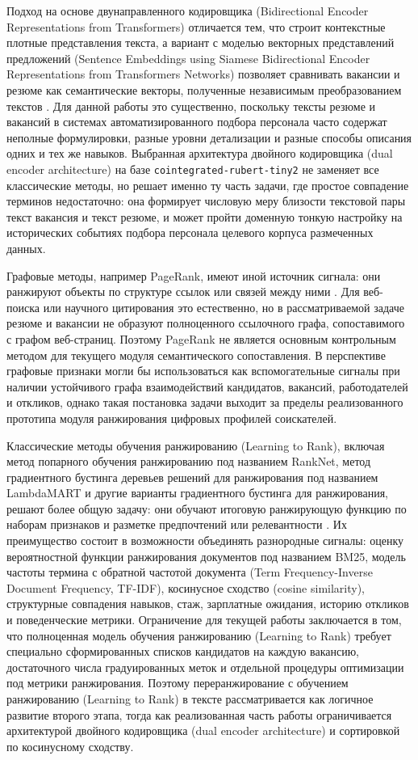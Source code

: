 Подход на основе двунаправленного кодировщика (Bidirectional Encoder Representations from Transformers) отличается тем, что строит контекстные плотные представления текста, а вариант с моделью векторных представлений предложений (Sentence Embeddings using Siamese Bidirectional Encoder Representations from Transformers Networks) позволяет сравнивать вакансии и резюме как семантические векторы, полученные независимым преобразованием текстов \cite{src05, src06}. Для данной работы это существенно, поскольку тексты резюме и вакансий в системах автоматизированного подбора персонала часто содержат неполные формулировки, разные уровни детализации и разные способы описания одних и тех же навыков. Выбранная архитектура двойного кодировщика (dual encoder architecture) на базе \texttt{cointegrated-rubert-tiny2} не заменяет все классические методы, но решает именно ту часть задачи, где простое совпадение терминов недостаточно: она формирует числовую меру близости текстовой пары текст вакансия и текст резюме, и может пройти доменную тонкую настройку на исторических событиях подбора персонала целевого корпуса размеченных данных.

Графовые методы, например PageRank, имеют иной источник сигнала: они ранжируют объекты по структуре ссылок или связей между ними \cite{src27}. Для веб-поиска или научного цитирования это естественно, но в рассматриваемой задаче резюме и вакансии не образуют полноценного ссылочного графа, сопоставимого с графом веб-страниц. Поэтому PageRank не является основным контрольным методом для текущего модуля семантического сопоставления. В перспективе графовые признаки могли бы использоваться как вспомогательные сигналы при наличии устойчивого графа взаимодействий кандидатов, вакансий, работодателей и откликов, однако такая постановка задачи выходит за пределы реализованного прототипа модуля ранжирования цифровых профилей соискателей.

Классические методы обучения ранжированию (Learning to Rank), включая метод попарного обучения ранжированию под названием RankNet, метод градиентного бустинга деревьев решений для ранжирования под названием LambdaMART и другие варианты градиентного бустинга для ранжирования, решают более общую задачу: они обучают итоговую ранжирующую функцию по наборам признаков и разметке предпочтений или релевантности \cite{src08, src09, src28}. Их преимущество состоит в возможности объединять разнородные сигналы: оценку вероятностной функции ранжирования документов под названием BM25, модель частоты термина с обратной частотой документа (Term Frequency-Inverse Document Frequency, TF-IDF), косинусное сходство (cosine similarity), структурные совпадения навыков, стаж, зарплатные ожидания, историю откликов и поведенческие метрики. Ограничение для текущей работы заключается в том, что полноценная модель обучения ранжированию (Learning to Rank) требует специально сформированных списков кандидатов на каждую вакансию, достаточного числа градуированных меток и отдельной процедуры оптимизации под метрики ранжирования. Поэтому переранжирование с обучением ранжированию (Learning to Rank) в тексте рассматривается как логичное развитие второго этапа, тогда как реализованная часть работы ограничивается архитектурой двойного кодировщика (dual encoder architecture) и сортировкой по косинусному сходству.


